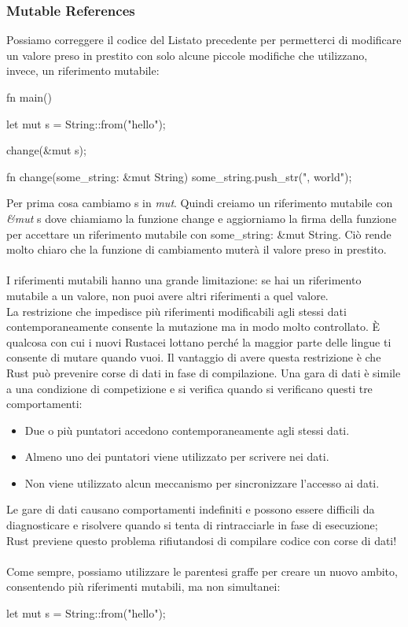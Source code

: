 \documentclass[11pt,a4paper]{article}
\begin{document}
{\subsubsection{Mutable References}
Possiamo correggere il codice del Listato precedente per permetterci di modificare un valore preso in prestito con solo alcune piccole modifiche che utilizzano, invece, un riferimento mutabile:

\begin{rust}
fn main() {
    let mut s = String::from("hello");

    change(&mut s);
}

fn change(some_string: &mut String) {
    some_string.push_str(", world");
}
\end{rust}

Per prima cosa cambiamo s in \textit{mut}. Quindi creiamo un riferimento mutabile con \textit{\&mut} s dove chiamiamo la funzione change e aggiorniamo la firma della funzione per accettare un riferimento mutabile con some\_string: \&mut String. Ciò rende molto chiaro che la funzione di cambiamento muterà il valore preso in prestito.\\
\\
I riferimenti mutabili hanno una grande limitazione: se hai un riferimento mutabile a un valore, non puoi avere altri riferimenti a quel valore.\\
La restrizione che impedisce più riferimenti modificabili agli stessi dati contemporaneamente consente la mutazione ma in modo molto controllato. È qualcosa con cui i nuovi Rustacei lottano perché la maggior parte delle lingue ti consente di mutare quando vuoi. Il vantaggio di avere questa restrizione è che Rust può prevenire corse di dati in fase di compilazione. Una gara di dati è simile a una condizione di competizione e si verifica quando si verificano questi tre comportamenti:
\begin{itemize}
\item Due o più puntatori accedono contemporaneamente agli stessi dati.
\item Almeno uno dei puntatori viene utilizzato per scrivere nei dati.
\item Non viene utilizzato alcun meccanismo per sincronizzare l’accesso ai dati.
\end{itemize}
Le gare di dati causano comportamenti indefiniti e possono essere difficili da diagnosticare e risolvere quando si tenta di rintracciarle in fase di esecuzione; Rust previene questo problema rifiutandosi di compilare codice con corse di dati!\\
\\
Come sempre, possiamo utilizzare le parentesi graffe per creare un nuovo ambito, consentendo più riferimenti mutabili, ma non simultanei:
\begin{rust}
    let mut s = String::from("hello");


\end{rust}}
\end{document}
